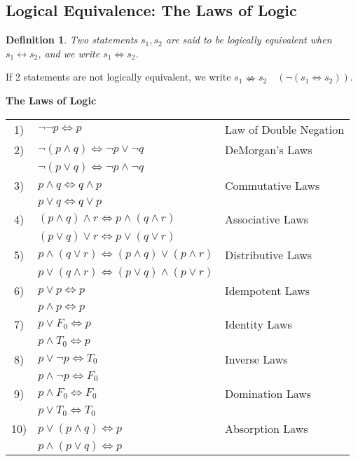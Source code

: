 \documentclass[12pt]{article}
\newtheorem{definition}{Definition} [section]
\begin{document}
\subsection{Logical Equivalence: The Laws of Logic}
\begin{definition}\emph{Two statements $s_1, s_2$ are said to be }logically equivalent \emph{when $s_1 \leftrightarrow s_2$, and we write $s_1 \Leftrightarrow s_2$}.
\end{definition}
\noindent If 2 statements are not logically equivalent, we write $s_1 \nLeftrightarrow s_2 \quad (\neg(s_1 \Leftrightarrow s_2))$.
\begin{center}
\textbf{The Laws of Logic}
\end{center}
\begin{tabular}  {c l l}
1) & $\neg \neg p \Leftrightarrow p$ & Law of Double Negation\\
2) & $\neg (p \wedge q) \Leftrightarrow \neg p \vee \neg q$ & DeMorgan's Laws\\
& $\neg (p \vee q) \Leftrightarrow \neg p \wedge \neg q$\\
3) & $p \wedge q \Leftrightarrow q \wedge p$ & Commutative Laws\\
& $p \vee q \Leftrightarrow q \vee p$\\
4) & $(p \wedge q) \wedge r \Leftrightarrow p \wedge (q \wedge r)$ & Associative Laws\\
& $(p \vee q) \vee r \Leftrightarrow p \vee (q \vee r)$\\
5) & $p \wedge (q \vee r) \Leftrightarrow (p \wedge q) \vee (p \wedge r)$ & Distributive Laws\\
& $p \vee (q \wedge r) \Leftrightarrow (p \vee q) \wedge (p \vee r)$\\
6) & $p \vee p \Leftrightarrow p$ & Idempotent Laws\\
& $p \wedge p \Leftrightarrow p$\\
7) & $p \vee F_0 \Leftrightarrow p$ & Identity Laws\\
& $p \wedge T_0 \Leftrightarrow p$\\
8) & $p \vee \neg p \Leftrightarrow T_0$ & Inverse Laws\\
& $p \wedge \neg p \Leftrightarrow F_0$\\
9) & $p \wedge F_0 \Leftrightarrow F_0$ & Domination Laws\\
& $p \vee T_0 \Leftrightarrow T_0$\\
10) & $p \vee (p \wedge q) \Leftrightarrow p$ & Absorption Laws\\
& $p \wedge (p \vee q) \Leftrightarrow p$
\end{tabular}
\end{document}
